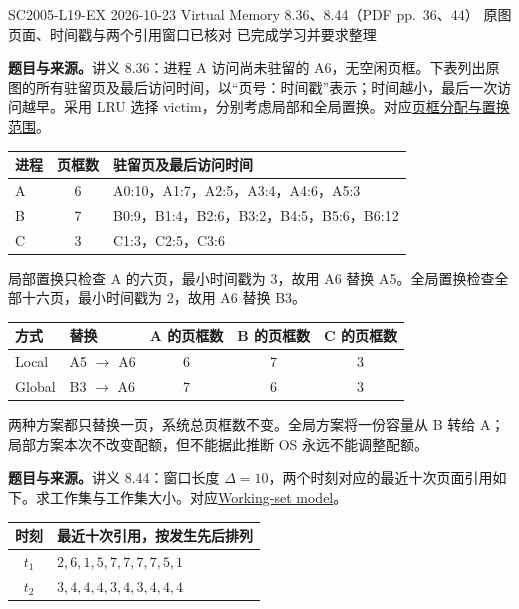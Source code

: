 \begingroup
\renewcommand{\recordid}[1]{}
\renewcommand{\relatedtopic}[2]{\hyperref[topic:#1]{#2}}

\examplemeta
  {SC2005-L19-EX}
  {2026-10-23}
  {Virtual Memory 8.36、8.44（PDF pp.~36、44）}
  {原图页面、时间戳与两个引用窗口已核对}
  {已完成学习并要求整理}

\linespread{1.15}\selectfont
\setlength{\parskip}{0.4em}

\textbf{题目与来源。}讲义 8.36：进程 A 访问尚未驻留的 A6，无空闲页框。下表列出原图的所有驻留页及最后访问时间，以“页号：时间戳”表示；时间越小，最后一次访问越早。采用 LRU 选择 victim，分别考虑局部和全局置换。对应\relatedtopic{SC2005-L19-T01}{页框分配与置换范围}。

\begin{center}
\begin{tabularx}{\textwidth}{@{}lc>{\raggedright\arraybackslash}X@{}}
\toprule
进程 & 页框数 & 驻留页及最后访问时间 \\
\midrule
A & 6 & A0:10，A1:7，A2:5，A3:4，A4:6，A5:3 \\
B & 7 & B0:9，B1:4，B2:6，B3:2，B4:5，B5:6，B6:12 \\
C & 3 & C1:3，C2:5，C3:6 \\
\bottomrule
\end{tabularx}
\end{center}

\begin{checkedsolution}
局部置换只检查 A 的六页，最小时间戳为 $3$，故用 A6 替换 A5。全局置换检查全部十六页，最小时间戳为 $2$，故用 A6 替换 B3。
\begin{center}
\begin{tabular}{@{}llccc@{}}
\toprule
方式 & 替换 & A 的页框数 & B 的页框数 & C 的页框数 \\
\midrule
Local & A5 $\to$ A6 & 6 & 7 & 3 \\
Global & B3 $\to$ A6 & 7 & 6 & 3 \\
\bottomrule
\end{tabular}
\end{center}
两种方案都只替换一页，系统总页框数不变。全局方案将一份容量从 B 转给 A；局部方案本次不改变配额，但不能据此推断 OS 永远不能调整配额。
\end{checkedsolution}

\textbf{题目与来源。}讲义 8.44：窗口长度 $\Delta=10$，两个时刻对应的最近十次页面引用如下。求工作集与工作集大小。对应\relatedtopic{SC2005-L19-T03}{Working-set model}。
\begin{center}
\begin{tabular}{@{}cl@{}}
\toprule
时刻 & 最近十次引用，按发生先后排列 \\
\midrule
$t_1$ & $2,6,1,5,7,7,7,7,5,1$ \\
$t_2$ & $3,4,4,4,3,4,3,4,4,4$ \\
\bottomrule
\end{tabular}
\end{center}

